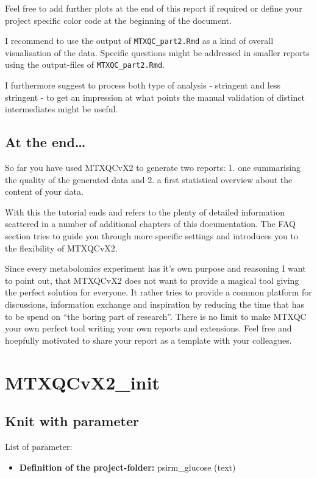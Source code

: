 \documentclass[]{book}
\providecommand{\tightlist}{%
  \setlength{\itemsep}{0pt}\setlength{\parskip}{0pt}}
\theoremstyle{definition}
\theoremstyle{definition}
\theoremstyle{definition}
\theoremstyle{remark}
\begin{document}
Feel free to add further plots at the end of this report if required or
define your project specific color code at the beginning of the
document.

I recommend to use the output of \texttt{MTXQC\_part2.Rmd} as a kind of
overall visualisation of the data. Specific questions might be addressed
in smaller reports using the output-files of \texttt{MTXQC\_part2.Rmd}.

I furthermore suggest to process both type of analysis - stringent and
less stringent - to get an impression at what points the manual
validation of distinct intermediates might be useful.

\section{At the end\ldots{}}\label{at-the-end-1}

So far you have used MTXQCvX2 to generate two reports: 1. one
summarising the quality of the generated data and 2. a first statistical
overview about the content of your data.

With this the tutorial ends and refers to the plenty of detailed
information scattered in a number of additional chapters of this
documentation. The FAQ section tries to guide you through more specific
settings and introduces you to the flexibility of MTXQCvX2.

Since every metabolomics experiment has it's own purpose and reasoning I
want to point out, that MTXQCvX2 does not want to provide a magical tool
giving the perfect solution for everyone. It rather tries to provide a
common platform for discussions, information exchange and inspiration by
reducing the time that has to be spend on ``the boring part of
research''. There is no limit to make MTXQC your own perfect tool
writing your own reports and extensions. Feel free and hoepfully
motivated to share your report as a template with your colleagues.

\chapter{MTXQCvX2\_init}\label{init}

\section{Knit with parameter}\label{knit-with-parameter}

List of parameter:

\begin{itemize}
\tightlist
\item
  \textbf{Definition of the project-folder:} psirm\_glucose (text)
\end{itemize}
\end{document}
